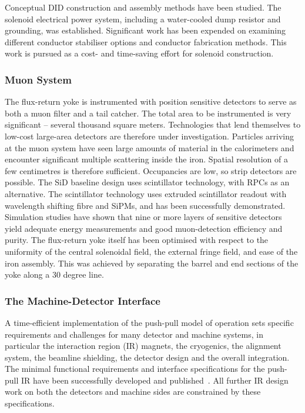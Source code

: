 Conceptual DID construction and
assembly methods have been studied. The solenoid electrical power system,
including a water-cooled dump resistor and grounding, was established.
Significant work has been expended on examining different conductor stabiliser
options and conductor fabrication methods. This work is pursued as a cost- and
time-saving effort for solenoid construction.

\subsubsection{Muon System}
The flux-return yoke is instrumented with position sensitive detectors to
serve as both a muon filter and a tail catcher. The total area to be
instrumented is very significant -- several thousand square meters. Technologies
that lend themselves to low-cost large-area detectors are therefore under
investigation. Particles arriving at the muon system have seen large amounts of
material in the calorimeters and encounter significant multiple scattering
inside the iron. Spatial resolution of a few centimetres is therefore
sufficient. Occupancies are low, so strip detectors are possible. The SiD 
baseline design uses scintillator technology, with RPCs as an alternative. 
The scintillator technology uses extruded scintillator readout with wavelength 
shifting fibre and SiPMs, and has been successfully demonstrated. 
Simulation studies have shown that nine or more layers of sensitive detectors 
yield adequate energy measurements and good muon-detection efficiency and purity.
The flux-return yoke itself has been optimised with respect to the
uniformity of the central solenoidal field, the external fringe field,
and ease of the iron assembly. 
This was achieved by separating the  barrel and end sections of the
yoke along a 30 degree line.

\subsubsection{The Machine-Detector Interface}
A time-efficient implementation of the push-pull model of
operation sets specific requirements and challenges for many detector and
machine systems, in particular the interaction region (IR) magnets, the
cryogenics, the alignment system, the beamline shielding, the detector design
and the overall integration. The minimal functional requirements and interface
specifications for the push-pull IR have been successfully developed and
published~\cite{Platform_Agreement,IR_Layout}.  All further IR design
work on both the detectors and machine sides are constrained by these 
specifications. 

